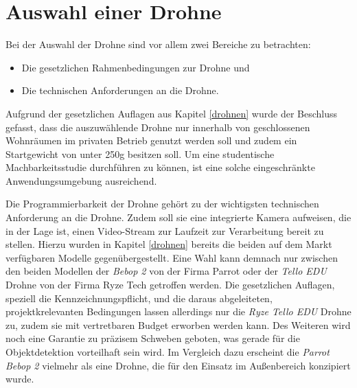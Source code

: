 \section{Auswahl einer Drohne} \label{drone_selection}

Bei der Auswahl der Drohne sind vor allem zwei Bereiche zu betrachten:

\begin{itemize}
	\item Die gesetzlichen Rahmenbedingungen zur Drohne und
	\item Die technischen Anforderungen an die Drohne.
\end{itemize}

Aufgrund der gesetzlichen Auflagen aus Kapitel \ref{drohnen} wurde der Beschluss gefasst, dass die auszuwählende Drohne nur innerhalb von geschlossenen Wohnräumen im privaten Betrieb genutzt werden soll und zudem ein Startgewicht von unter 250g besitzen soll. Um eine studentische Machbarkeitsstudie durchführen zu können, ist eine solche eingeschränkte Anwendungsumgebung ausreichend. 

Die Programmierbarkeit der Drohne gehört zu der wichtigsten technischen Anforderung an die Drohne. Zudem soll sie eine integrierte Kamera aufweisen, die in der Lage ist, einen Video-Stream zur Laufzeit zur Verarbeitung bereit zu stellen. Hierzu wurden in Kapitel \ref{drohnen} bereits die beiden auf dem Markt verfügbaren Modelle  gegenübergestellt. Eine Wahl kann demnach nur zwischen den beiden Modellen der \textit{Bebop 2} von der Firma Parrot oder der \textit{Tello EDU} Drohne von der Firma Ryze Tech getroffen werden. Die gesetzlichen Auflagen, speziell die Kennzeichnungspflicht, und die daraus abgeleiteten, projektkrelevanten Bedingungen lassen allerdings nur die \textit{Ryze Tello EDU} Drohne zu, zudem sie mit vertretbaren Budget erworben werden kann. Des Weiteren wird noch eine Garantie zu präzisem Schweben geboten, was gerade für die Objektdetektion vorteilhaft sein wird. Im Vergleich dazu erscheint die \textit{Parrot Bebop 2} vielmehr als eine Drohne, die für den Einsatz im Außenbereich konzipiert wurde.

